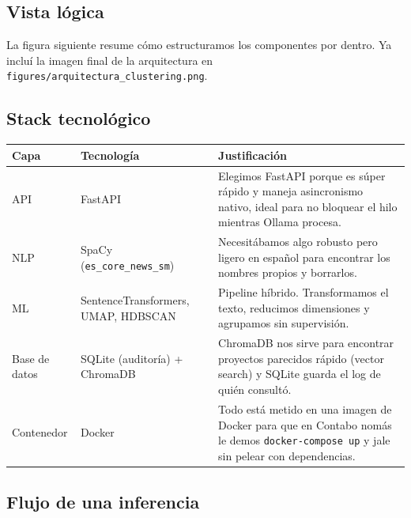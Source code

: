 

\subsection{Vista lógica}

La figura siguiente resume cómo estructuramos los componentes por dentro. Ya incluí la imagen final de la arquitectura en \texttt{figures/arquitectura\_clustering.png}.


\subsection{Stack tecnológico}

\begin{tabular}{@{}llp{6.5cm}@{}}
  \toprule
  Capa & Tecnología & Justificación \\
  \midrule
  API & FastAPI & Elegimos FastAPI porque es súper rápido y maneja asincronismo nativo, ideal para no bloquear el hilo mientras Ollama procesa. \\
  NLP & SpaCy (\texttt{es\_core\_news\_sm}) & Necesitábamos algo robusto pero ligero en español para encontrar los nombres propios y borrarlos. \\
  ML & SentenceTransformers, UMAP, HDBSCAN & Pipeline híbrido. Transformamos el texto, reducimos dimensiones y agrupamos sin supervisión. \\
  Base de datos & SQLite (auditoría) + ChromaDB & ChromaDB nos sirve para encontrar proyectos parecidos rápido (vector search) y SQLite guarda el log de quién consultó. \\
  Contenedor & Docker & Todo está metido en una imagen de Docker para que en Contabo nomás le demos \texttt{docker-compose up} y jale sin pelear con dependencias. \\
  \bottomrule
\end{tabular}

\subsection{Flujo de una inferencia}

